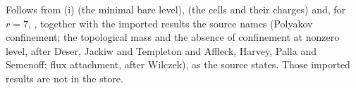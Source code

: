 Follows from (i) (the minimal bare level),  (the cells and their charges) and, for $r = 7$, , together with the imported results the source names (Polyakov confinement; the topological mass and the absence of confinement at nonzero level, after Deser, Jackiw and Templeton and Affleck, Harvey, Palla and Semenoff; flux attachment, after Wilczek), as the source states. Those imported results are not in the store.
